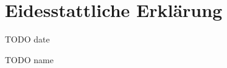 \section{Eidesstattliche Erklärung}


\bigskip
\bigskip
\bigskip
\bigskip
	
\begin{multicols}{2}
  \raggedright
  TODO date
  
  \raggedleft
  TODO name
\end{multicols}
